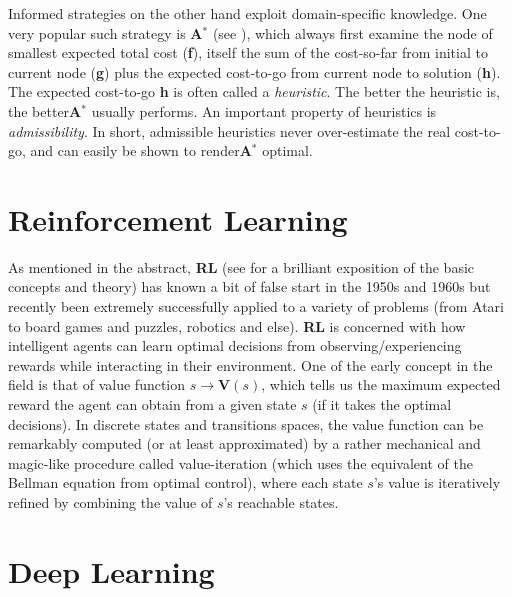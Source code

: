 Informed strategies on the other hand exploit domain-specific knowledge. One very popular such strategy is \textbf{A$^{*}$} (see \cite{DBLP:journals/jacm/DechterP85}), which always first examine the node of smallest expected total cost (\textbf{f}), itself the sum of the cost-so-far from initial to current node (\textbf{g}) plus the expected cost-to-go from current node to solution (\textbf{h}). The expected cost-to-go \textbf{h} is often called a \textit{heuristic}. The better the heuristic is, the better\textbf{A$^{*}$} usually performs. An important property of heuristics is \textit{admissibility}. In short, admissible heuristics never over-estimate the real cost-to-go, and can easily be shown to render\textbf{A$^{*}$} optimal.




\section{Reinforcement Learning}

As mentioned in the abstract, \textbf{RL} (see \cite{Sutton1998} for a brilliant exposition of the basic concepts and theory) has known a bit of false start in the 1950s and 1960s but recently been extremely successfully applied to a variety of problems (from Atari to board games and puzzles, robotics and else). \textbf{RL} is concerned with how intelligent agents can learn optimal decisions from observing/experiencing rewards while interacting in their environment. One of the early concept in the field is that of value function $s \to \textbf{V}(s)$, which tells us the maximum expected reward the agent can obtain from a given state $s$ (if it takes the optimal decisions). In discrete states and transitions spaces, the value function can be remarkably computed (or at least approximated) by a rather mechanical and magic-like procedure called value-iteration (which uses the equivalent of the Bellman equation from optimal control), where each state $s$'s value is iteratively refined by combining the value of $s$'s reachable states.






\section{Deep Learning}

